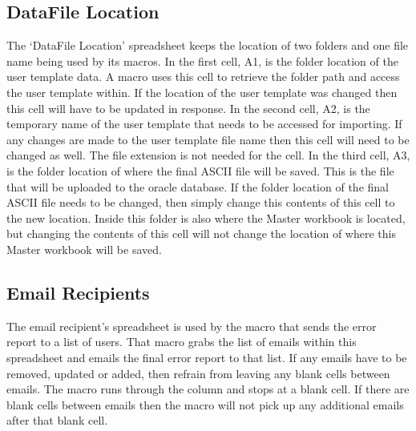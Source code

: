 \documentclass[12pt,a4paper]{report}
\begin{document}
        \subsection{DataFile Location}
        The ‘DataFile Location’ spreadsheet keeps the location of two folders and one file name being used by its macros. 
        \newline
        \newline
        In the first cell, A1, is the folder location of the user template data. A macro uses this cell to retrieve the folder path and access the user template within. If the location of the user template was changed then this cell will have to be updated in response. 
        \newline
        \newline
        In the second cell, A2, is the temporary name of the user template that needs to be accessed for importing. If any changes are made to the user template file name then this cell will need to be changed as well. The file extension is not needed for the cell.
        \newline
        \newline
        In the third cell, A3, is the folder location of where the final ASCII file will be saved. This is the file that will be uploaded to the oracle database. If the folder location of the final ASCII file needs to be changed, then simply change this contents of this cell to the new location. Inside this folder is also where the Master workbook is located, but changing the contents of this cell will not change the location of where this Master workbook will be saved.
        
        \subsection{Email Recipients}
        
        The email recipient’s spreadsheet is used by the macro that sends the error report to a list of users. That macro grabs the list of emails within this spreadsheet and emails the final error report to that list. 
        \newline
        \newline
        If any emails have to be removed, updated or added, then refrain from leaving any blank cells between emails. The macro runs through the column and stops at a blank cell. If there are blank cells between emails then the macro will not pick up any additional emails after that blank cell.
\end{document}
